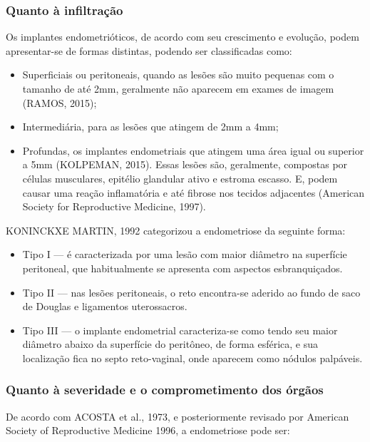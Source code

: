 \documentclass[12pt]{article} %
\begin{document}
\subsubsection{Quanto à infiltração}

Os implantes endometrióticos, de acordo com seu crescimento e evolução,
podem apresentar-se de formas distintas, podendo ser classificadas
como:
\begin{itemize}

\item Superficiais ou peritoneais, quando as lesões são muito pequenas
com o tamanho de até 2mm, geralmente não aparecem em exames de imagem (RAMOS, 2015);
\item Intermediária, para as lesões que atingem de 2mm a 4mm; 
\item Profundas, os implantes endometriais que atingem uma área igual ou superior a 5mm (KOLPEMAN, 2015).
Essas lesões são, geralmente, compostas por células musculares,
epitélio glandular ativo e estroma escasso. E, podem causar uma reação
inflamatória e até fibrose nos tecidos adjacentes (American Society
for Reproductive Medicine, 1997).
\end{itemize}

KONINCKXE MARTIN, 1992 categorizou a endometriose da seguinte forma:

\begin{itemize}
\item Tipo I --- é caracterizada por uma lesão com maior diâmetro na
  superfície peritoneal, que habitualmente se apresenta com aspectos
  esbranquiçados.
\item Tipo II --- nas lesões peritoneais, o reto encontra-se aderido ao
  fundo de saco de Douglas e ligamentos uterossacros.
\item Tipo III --- o implante endometrial caracteriza-se como tendo
  seu maior diâmetro abaixo da superfície do peritôneo, de forma
  esférica, e sua localização fica no septo reto-vaginal, onde
  aparecem como nódulos palpáveis.
\end{itemize}

\subsubsection{Quanto à severidade e o comprometimento dos órgãos}

De acordo com ACOSTA et al., 1973, e posteriormente revisado por American Society of Reproductive Medicine 1996, a endometriose pode ser:
\end{document}
